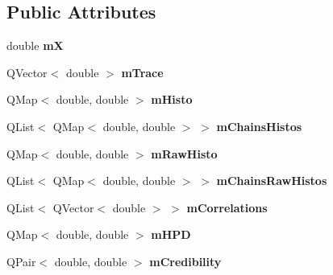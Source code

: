 \subsection*{Public Attributes}
\begin{DoxyCompactItemize}
\item 
\hypertarget{class_metropolis_variable_aa6c96be086130134a130097bb979e376}{double {\bfseries m\-X}}\label{class_metropolis_variable_aa6c96be086130134a130097bb979e376}

\item 
\hypertarget{class_metropolis_variable_a5d04d81880101f46c37b7b3736bff4c6}{Q\-Vector$<$ double $>$ {\bfseries m\-Trace}}\label{class_metropolis_variable_a5d04d81880101f46c37b7b3736bff4c6}

\item 
\hypertarget{class_metropolis_variable_a0908d7559d045d00c480282e700e13de}{Q\-Map$<$ double, double $>$ {\bfseries m\-Histo}}\label{class_metropolis_variable_a0908d7559d045d00c480282e700e13de}

\item 
\hypertarget{class_metropolis_variable_a77f44e8162a733d59983f10319960b9b}{Q\-List$<$ Q\-Map$<$ double, double $>$ $>$ {\bfseries m\-Chains\-Histos}}\label{class_metropolis_variable_a77f44e8162a733d59983f10319960b9b}

\item 
\hypertarget{class_metropolis_variable_abd8a7b3212bc6b737e83d282daaa5edf}{Q\-Map$<$ double, double $>$ {\bfseries m\-Raw\-Histo}}\label{class_metropolis_variable_abd8a7b3212bc6b737e83d282daaa5edf}

\item 
\hypertarget{class_metropolis_variable_a3fee24fc97ec4e91514d32e9cacb8950}{Q\-List$<$ Q\-Map$<$ double, double $>$ $>$ {\bfseries m\-Chains\-Raw\-Histos}}\label{class_metropolis_variable_a3fee24fc97ec4e91514d32e9cacb8950}

\item 
\hypertarget{class_metropolis_variable_a38fe62fc483f783cee4a66b4bab792fd}{Q\-List$<$ Q\-Vector$<$ double $>$ $>$ {\bfseries m\-Correlations}}\label{class_metropolis_variable_a38fe62fc483f783cee4a66b4bab792fd}

\item 
\hypertarget{class_metropolis_variable_a5e87016fac969986a2ea7ebed1f84105}{Q\-Map$<$ double, double $>$ {\bfseries m\-H\-P\-D}}\label{class_metropolis_variable_a5e87016fac969986a2ea7ebed1f84105}

\item 
\hypertarget{class_metropolis_variable_a7a5687312583aaedfdbfaea50118e215}{Q\-Pair$<$ double, double $>$ {\bfseries m\-Credibility}}\label{class_metropolis_variable_a7a5687312583aaedfdbfaea50118e215}


\end{DoxyCompactItemize}
